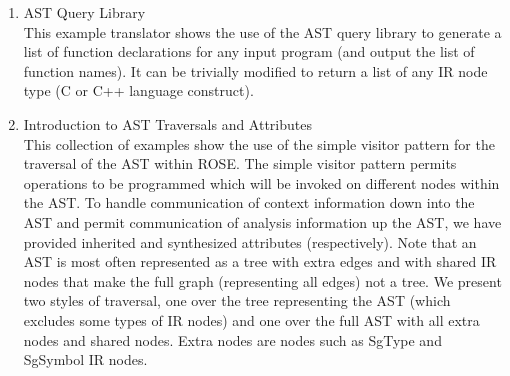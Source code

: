 \begin{enumerate}
     \item AST Query Library \\
           This example translator shows the use of the AST query library to generate
           a list of function declarations for any input program (and output the list
           of function names).  It can be trivially modified to return a list of any
           IR node type (C or C++ language construct).

     \item Introduction to AST Traversals and Attributes \\
           This collection of examples show the use of the simple visitor pattern for 
           the traversal of the AST within ROSE.  The simple visitor pattern permits
           operations to be programmed which will be invoked on different nodes 
           within the AST.  To handle communication of context information down into the
           AST and permit communication of analysis information up the AST, we have 
           provided inherited and synthesized attributes (respectively). Note that
           an AST is most often represented as a tree with extra edges and with shared IR
           nodes that make the full graph (representing all edges) not a tree.  We present
           two styles of traversal, one over the tree representing the AST (which
           excludes some types of IR nodes) and one over the full AST with all extra
           nodes and shared nodes.  Extra nodes are nodes such as SgType and SgSymbol 
           IR nodes.


\end{enumerate}

